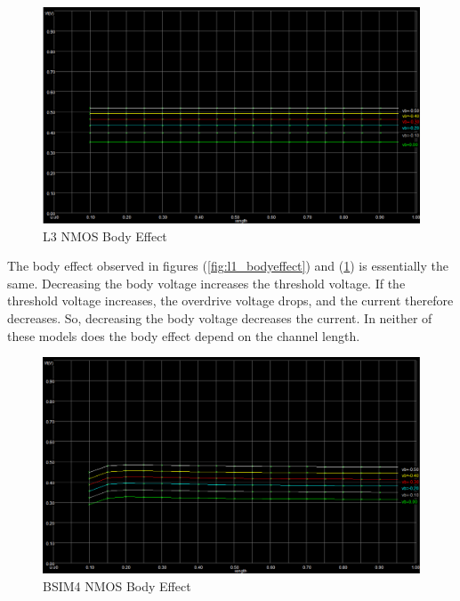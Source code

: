 \FloatBarrier

\FloatBarrier

\begin{figure}[h!]
	\centering
	\includegraphics[scale=0.50]{./images/level3_body_effect_nmos.PNG}
	\caption{L3 NMOS Body Effect}
	\label{fig:l3_bodyeffect}
\end{figure}

\FloatBarrier

The body effect observed in figures (\ref{fig:l1_bodyeffect}) and (\ref{fig:l3_bodyeffect}) is essentially the same.
Decreasing the body voltage increases the threshold voltage.
If the threshold voltage increases, the overdrive voltage drops, and the current therefore decreases.
So, decreasing the body voltage decreases the current.
In neither of these models does the body effect depend on the channel length.

\FloatBarrier

\begin{figure}[h!]
	\centering
	\includegraphics[scale=0.50]{./images/bsim4_body_effect_nmos.PNG}
	\caption{BSIM4 NMOS Body Effect}
	\label{fig:bsim4_bodyeffect}
\end{figure}

